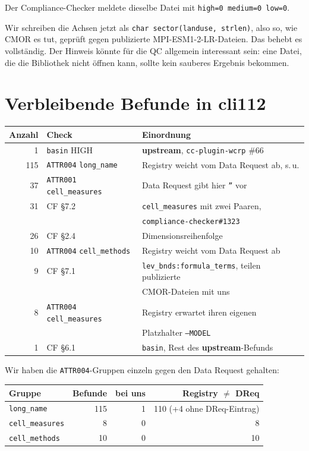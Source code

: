 \documentclass[11pt,a4paper]{article}
\newcommand{\code}[1]{\texttt{\small #1}}
\newcommand{\upstream}{\textcolor{blue!60!black}{\textbf{upstream}}}
\begin{document}
Der Compliance-Checker meldete dieselbe Datei mit \code{high=0 medium=0 low=0}.

Wir schreiben die Achsen jetzt als \code{char sector(landuse, strlen)}, also so, wie
CMOR es tut, gepr\"uft gegen publizierte MPI-ESM1-2-LR-Dateien. Das behebt es
vollst\"andig. Der Hinweis k\"onnte f\"ur die QC allgemein interessant sein: eine
Datei, die die Bibliothek nicht \"offnen kann, sollte kein sauberes Ergebnis
bekommen.

\section{Verbleibende Befunde in cli112}

\begin{longtable}{rll}
\toprule
\textbf{Anzahl} & \textbf{Check} & \textbf{Einordnung} \\
\midrule
\endhead
1   & \code{basin} HIGH   & \upstream, \code{cc-plugin-wcrp} \#66 \\
115 & \code{ATTR004} \code{long\_name} & Registry weicht vom Data Request ab, s.\,u. \\
37  & \code{ATTR001} \code{cell\_measures} & Data Request gibt hier \code{''} vor \\
31  & CF \S7.2            & \code{cell\_measures} mit zwei Paaren, \\
    &                     & \code{compliance-checker\#1323} \\
26  & CF \S2.4            & Dimensionsreihenfolge \\
10  & \code{ATTR004} \code{cell\_methods} & Registry weicht vom Data Request ab \\
9   & CF \S7.1            & \code{lev\_bnds:formula\_terms}, teilen publizierte \\
    &                     & CMOR-Dateien mit uns \\
8   & \code{ATTR004} \code{cell\_measures} & Registry erwartet ihren eigenen \\
    &                     & Platzhalter \code{--MODEL} \\
1   & CF \S6.1            & \code{basin}, Rest des \upstream-Befunds \\
\bottomrule
\end{longtable}

Wir haben die \code{ATTR004}-Gruppen einzeln gegen den Data Request gehalten:

\begin{center}
\begin{tabular}{lrrr}
\toprule
\textbf{Gruppe} & \textbf{Befunde} & \textbf{bei uns} & \textbf{Registry $\neq$ DReq} \\
\midrule
\code{long\_name}    & 115 & 1 & 110 (+4 ohne DReq-Eintrag) \\
\code{cell\_measures} &   8 & 0 & 8 \\
\code{cell\_methods}  &  10 & 0 & 10 \\
\bottomrule
\end{tabular}
\end{center}
\end{document}
